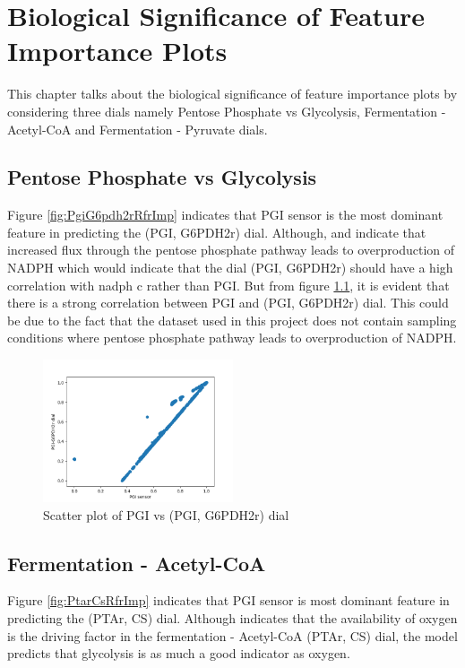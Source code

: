\documentclass[12pt,chapterheads]{ucsd}
\begin{document}
\chapter{Biological Significance of Feature Importance Plots}\label{chap:bioSig}
 This chapter talks about the biological significance of feature importance plots by considering three dials namely Pentose Phosphate vs Glycolysis, Fermentation - Acetyl-CoA and Fermentation - Pyruvate dials.
\section{Pentose Phosphate vs Glycolysis}
Figure \ref{fig:PgiG6pdh2rRfrImp} indicates that PGI sensor is the most dominant feature in predicting the (PGI, G6PDH2r) dial. Although, \cite{pmid16899} and \cite{Fraenkel1967} indicate that increased flux through the pentose phosphate pathway leads to overproduction of NADPH which would indicate that the dial (PGI, G6PDH2r) should have a high correlation with nadph \textunderscore c rather than PGI. But from figure \ref{fig:PGIvsPGIG6PDH2rDial}, it is evident that there is a strong correlation between PGI and (PGI, G6PDH2r) dial. This could be due to the fact that the dataset used in this project does not contain sampling conditions where pentose phosphate pathway leads to overproduction of NADPH.
\begin{figure}[h] 
\centering
\includegraphics[width=0.5\textwidth]{PGI_PGI_G6PDH2r_new.png}
\caption[Scatter plot of PGI vs (PGI, G6PDH2r) dial]
{Scatter plot of PGI vs (PGI, G6PDH2r) dial}
\label{fig:PGIvsPGIG6PDH2rDial}
\end{figure}

\section{Fermentation - Acetyl-CoA}
Figure \ref{fig:PtarCsRfrImp} indicates that PGI sensor is most dominant feature in predicting the (PTAr, CS) dial. Although \cite{pmid9484901} indicates that the availability of oxygen is the driving factor in the fermentation - Acetyl-CoA (PTAr, CS) dial, the model predicts that glycolysis is as much a good indicator as oxygen. 
\end{document}
